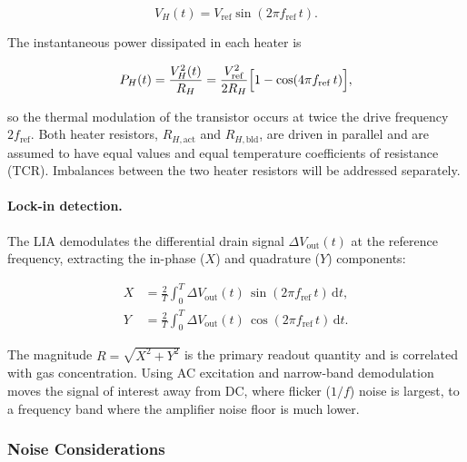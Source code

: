 \documentclass{report}
\begin{document}
\begin{equation}
  V_H(t) = V_{\mathrm{ref}} \sin(2\pi f_{\mathrm{ref}}\, t).
  \label{eq:heater_drive}
\end{equation}

The instantaneous power dissipated in each heater is

\begin{equation}
  P_H(t) = \frac{V_H^2(t)}{R_H}
          = \frac{V_{\mathrm{ref}}^2}{2 R_H}
            \Bigl[1 - \cos(4\pi f_{\mathrm{ref}}\, t)\Bigr],
  \label{eq:heater_power}
\end{equation}

so the thermal modulation of the transistor occurs at twice the drive
frequency $2f_{\mathrm{ref}}$.
Both heater resistors, $R_{H,\mathrm{act}}$ and $R_{H,\mathrm{bld}}$, are
driven in parallel and are assumed to have equal values and equal temperature
coefficients of resistance (TCR). Imbalances between the two heater resistors
will be addressed separately.

\paragraph{Lock-in detection.}
The LIA demodulates the differential drain signal $\Delta V_{\mathrm{out}}(t)$
at the reference frequency, extracting the in-phase ($X$) and quadrature ($Y$)
components:

\begin{align}
  X &= \frac{2}{T}\int_0^T \Delta V_{\mathrm{out}}(t)\,
        \sin(2\pi f_{\mathrm{ref}}\, t)\, \mathrm{d}t,
  \label{eq:lia_x} \\
  Y &= \frac{2}{T}\int_0^T \Delta V_{\mathrm{out}}(t)\,
        \cos(2\pi f_{\mathrm{ref}}\, t)\, \mathrm{d}t.
  \label{eq:lia_y}
\end{align}

The magnitude $R = \sqrt{X^2 + Y^2}$ is the primary readout quantity and
is correlated with gas concentration. Using AC excitation and narrow-band
demodulation moves the signal of interest away from DC, where flicker
($1/f$) noise is largest, to a frequency band where the amplifier noise
floor is much lower.

\subsubsection{Noise Considerations}
\end{document}
